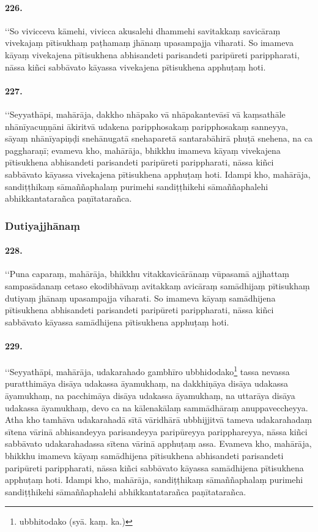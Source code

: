 \paragraph{226.} ‘‘So vivicceva kāmehi, vivicca akusalehi dhammehi savitakkaṃ savicāraṃ vivekajaṃ pītisukhaṃ paṭhamaṃ jhānaṃ upasampajja viharati. So imameva kāyaṃ vivekajena pītisukhena abhisandeti parisandeti paripūreti parippharati, nāssa kiñci sabbāvato kāyassa vivekajena pītisukhena apphuṭaṃ hoti.

\paragraph{227.} ‘‘Seyyathāpi, mahārāja, dakkho nhāpako vā nhāpakantevāsī vā kaṃsathāle nhānīyacuṇṇāni ākiritvā udakena paripphosakaṃ paripphosakaṃ sanneyya, sāyaṃ nhānīyapiṇḍi snehānugatā snehaparetā santarabāhirā phuṭā snehena, na ca paggharaṇī; evameva kho, mahārāja, bhikkhu imameva kāyaṃ vivekajena pītisukhena abhisandeti parisandeti paripūreti parippharati, nāssa kiñci sabbāvato kāyassa vivekajena pītisukhena apphuṭaṃ hoti. Idampi kho, mahārāja, sandiṭṭhikaṃ sāmaññaphalaṃ purimehi sandiṭṭhikehi sāmaññaphalehi abhikkantatarañca paṇītatarañca.

\subsubsection{Dutiyajjhānaṃ}

\paragraph{228.} ‘‘Puna caparaṃ, mahārāja, bhikkhu vitakkavicārānaṃ vūpasamā ajjhattaṃ sampasādanaṃ cetaso ekodibhāvaṃ avitakkaṃ avicāraṃ samādhijaṃ pītisukhaṃ dutiyaṃ jhānaṃ upasampajja viharati. So imameva kāyaṃ samādhijena pītisukhena abhisandeti parisandeti paripūreti parippharati, nāssa kiñci sabbāvato kāyassa samādhijena pītisukhena apphuṭaṃ hoti.

\paragraph{229.} ‘‘Seyyathāpi, mahārāja, udakarahado gambhīro ubbhidodako\footnote{ubbhitodako (syā. kaṃ. ka.)} tassa nevassa puratthimāya disāya udakassa āyamukhaṃ, na dakkhiṇāya disāya udakassa āyamukhaṃ, na pacchimāya disāya udakassa āyamukhaṃ, na uttarāya disāya udakassa āyamukhaṃ, devo ca na kālenakālaṃ sammādhāraṃ anuppaveccheyya. Atha kho tamhāva udakarahadā sītā vāridhārā ubbhijjitvā tameva udakarahadaṃ sītena vārinā abhisandeyya parisandeyya paripūreyya paripphareyya, nāssa kiñci sabbāvato udakarahadassa sītena vārinā apphuṭaṃ assa. Evameva kho, mahārāja, bhikkhu imameva kāyaṃ samādhijena pītisukhena abhisandeti parisandeti paripūreti parippharati, nāssa kiñci sabbāvato kāyassa samādhijena pītisukhena apphuṭaṃ hoti. Idampi kho, mahārāja, sandiṭṭhikaṃ sāmaññaphalaṃ purimehi sandiṭṭhikehi sāmaññaphalehi abhikkantatarañca paṇītatarañca.

